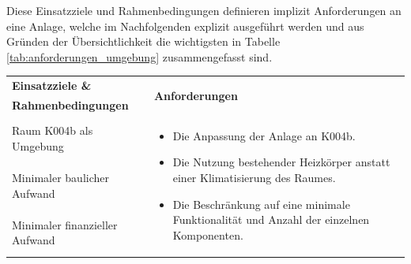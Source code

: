 Diese Einsatzziele und Rahmenbedingungen definieren implizit Anforderungen an eine Anlage, welche im Nachfolgenden explizit ausgeführt werden und aus Gründen der Übersichtlichkeit die wichtigsten in Tabelle \ref{tab:anforderungen_umgebung} zusammengefasst sind.


\begin{table}[H]
\centering
\small
\renewcommand{\arraystretch}{1.4}
\begin{tabularx}{1\textwidth}{m{}m{}}

\toprule

\textbf{Einsatzziele \&} & \multirow{2}{\hsize}{\textbf{Anforderungen}} \\ 
\textbf{Rahmenbedingungen} & \\

\cmidrule[0.5pt](r{0.25em}){1-1} 
\cmidrule[0.5pt](l{0.25em}){2-2}

Raum K004b als Umgebung  & \multirow{3}{\hsize}{
\begin{minipage}[t]{0.57\textwidth}
\begin{itemize}[itemsep=0pt,topsep=0pt,leftmargin=5mm]
	\item Die Anpassung der Anlage an K004b.
	\item Die Nutzung bestehender Heizkörper anstatt einer Klimatisierung des Raumes. 
	\item Die Beschränkung auf eine minimale Funktionalität und Anzahl der einzelnen Komponenten. 
\end{itemize}
\end{minipage}
}
 \\
	
\cmidrule[0.1pt](lr{2em}){1-1} 
Minimaler baulicher Aufwand & \\

\cmidrule[0.1pt](lr{2em}){1-1} 
Minimaler finanzieller \newline Aufwand &\\ 

\cmidrule[0.5pt](r{0.25em}){1-1} 
\cmidrule[0.5pt](l{0.25em}){2-2}


\end{tabularx}
\end{table}
